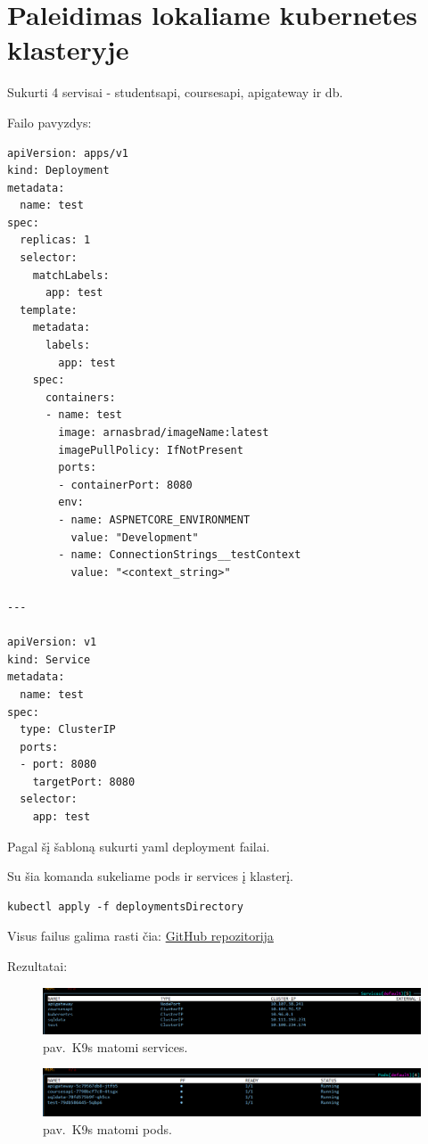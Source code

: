 \documentclass[14pt]{extarticle}
\renewcommand{\thefigure}{\arabic{figure} pav.}
\begin{document}
\clearpage

\section{Paleidimas lokaliame kubernetes klasteryje}

Sukurti 4 servisai - studentsapi, coursesapi, apigateway ir db.

Failo pavyzdys:

\begin{verbatim}
apiVersion: apps/v1
kind: Deployment
metadata:
  name: test
spec:
  replicas: 1
  selector:
    matchLabels:
      app: test
  template:
    metadata:
      labels:
        app: test
    spec:
      containers:
      - name: test
        image: arnasbrad/imageName:latest
        imagePullPolicy: IfNotPresent
        ports:
        - containerPort: 8080
        env:
        - name: ASPNETCORE_ENVIRONMENT
          value: "Development"
        - name: ConnectionStrings__testContext
          value: "<context_string>"

---

apiVersion: v1
kind: Service
metadata:
  name: test
spec:
  type: ClusterIP
  ports:
  - port: 8080
    targetPort: 8080
  selector:
    app: test
\end{verbatim}

Pagal šį šabloną sukurti yaml deployment failai.

Su šia komanda sukeliame pods ir services į klasterį.
\begin{verbatim}
kubectl apply -f deploymentsDirectory
\end{verbatim}

Visus failus galima rasti čia: \href{https://github.com/arnasbrad/clouds_inz}{GitHub repozitorija}

\clearpage
Rezultatai:

\begin{figure}[!htbp]
	\includegraphics[width=\textwidth]{images/first/1.png}
	\caption{\thefigure\ K9s matomi services.}
\end{figure}

\begin{figure}[!htbp]
	\includegraphics[width=\textwidth]{images/first/2.png}
	\caption{\thefigure\ K9s matomi pods.}
\end{figure}
\end{document}
